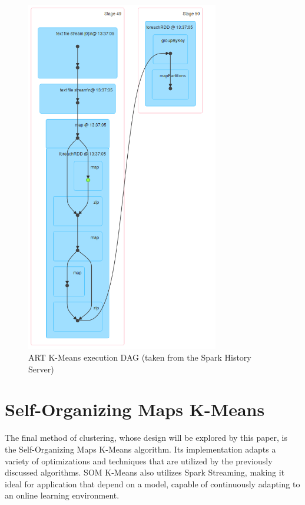 \documentclass{l4proj}
\begin{document}
\begin{figure}[H]
	\centering
    \label{fig:dag7}
    \includegraphics[width=0.75\textwidth]{images/DAG7}
    \caption{ART K-Means execution DAG (taken from the Spark History Server)} 
\end{figure}


\chapter{Self-Organizing Maps K-Means}
\label{som}

The final method of clustering, whose design will be explored by this paper, is the Self-Organizing Maps K-Means algorithm. Its implementation adapts a variety of optimizations and techniques that are utilized by the previously discussed algorithms. SOM K-Means also utilizes Spark Streaming, making it ideal for application that depend on a model, capable of continuously adapting to an online learning environment.
\end{document}
